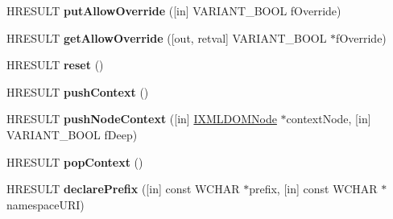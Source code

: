 \begin{DoxyCompactItemize}
\item 
\mbox{\label{interface_m_s_x_m_l2_1_1_i_m_x_namespace_manager_a7010327ea2b84999c33d2cdef0eb25c3}} 
H\+R\+E\+S\+U\+LT {\bfseries put\+Allow\+Override} (\mbox{[}in\mbox{]} V\+A\+R\+I\+A\+N\+T\+\_\+\+B\+O\+OL f\+Override)
\item 
\mbox{\label{interface_m_s_x_m_l2_1_1_i_m_x_namespace_manager_a4bc4fe125f2368a55a2d54bce678effe}} 
H\+R\+E\+S\+U\+LT {\bfseries get\+Allow\+Override} (\mbox{[}out, retval\mbox{]} V\+A\+R\+I\+A\+N\+T\+\_\+\+B\+O\+OL $\ast$f\+Override)
\item 
\mbox{\label{interface_m_s_x_m_l2_1_1_i_m_x_namespace_manager_ae355bf6f86730d5aabfb238344d7ba13}} 
H\+R\+E\+S\+U\+LT {\bfseries reset} ()
\item 
\mbox{\label{interface_m_s_x_m_l2_1_1_i_m_x_namespace_manager_a08d39f648502ef258194bac10147dfad}} 
H\+R\+E\+S\+U\+LT {\bfseries push\+Context} ()
\item 
\mbox{\label{interface_m_s_x_m_l2_1_1_i_m_x_namespace_manager_a32c79639b6b72a22495c91059f7567cb}} 
H\+R\+E\+S\+U\+LT {\bfseries push\+Node\+Context} (\mbox{[}in\mbox{]} \hyperlink{interface_m_s_x_m_l2_1_1_i_x_m_l_d_o_m_node}{I\+X\+M\+L\+D\+O\+M\+Node} $\ast$context\+Node, \mbox{[}in\mbox{]} V\+A\+R\+I\+A\+N\+T\+\_\+\+B\+O\+OL f\+Deep)
\item 
\mbox{\label{interface_m_s_x_m_l2_1_1_i_m_x_namespace_manager_a475969e897c1492d3958f6212031cbb7}} 
H\+R\+E\+S\+U\+LT {\bfseries pop\+Context} ()
\item 
\mbox{\label{interface_m_s_x_m_l2_1_1_i_m_x_namespace_manager_af0eb6d291e8e67e3fbccd63f2e0a3f89}} 
H\+R\+E\+S\+U\+LT {\bfseries declare\+Prefix} (\mbox{[}in\mbox{]} const W\+C\+H\+AR $\ast$prefix, \mbox{[}in\mbox{]} const W\+C\+H\+AR $\ast$namespace\+U\+RI)
\item 
\mbox{\label{interface_m_s_x_m_l2_1_1_i_m_x_namespace_manager_a5f7f412eff4e7b88d325d294c6521a93}} 

\end{DoxyCompactItemize}
